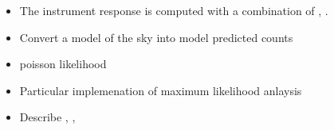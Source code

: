 \begin{itemize}
  \item The instrument response is computed with a combination of \gtltcube,
    \gtexpcube.

  \item Convert a model of the sky into model predicted counts
  \item poisson likelihood
  \item Particular implemenation of maximum likelihood anlaysis
  \item Describe \gtbin, \gtselect, \gtlike
\end{itemize}

